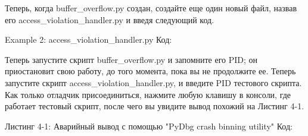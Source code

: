 \documentclass[12pt]{book}
\begin{document}



Теперь, когда buffer\_overflow.py создан, создайте еще один новый файл, назвав его access\_violation\_handler.py и введя следующий код.

Example 2: access\_violation\_handler.py
Код:








Теперь запустите скрипт buffer\_overflow.py и запомните его PID; он приостановит свою работу, до того момента, пока вы не продолжите ее. Теперь запустите скрипт access\_violation\_handler.py, и введите PID тестового скрипта. Как только отладчик присоединиться, нажмите любую клавишу в консоли, где работает тестовый скрипт, после чего вы увидите вывод похожий на Листинг 4-1.

Листинг 4-1: Аварийный вывод с помощью "PyDbg crash binning utility"
Код:

\end{document}
